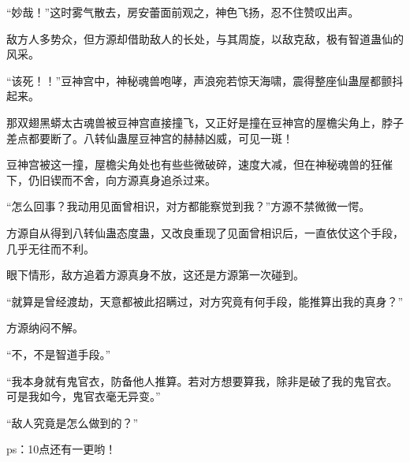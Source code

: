 \begin{this_body}
“妙哉！”这时雾气散去，房安蕾面前观之，神色飞扬，忍不住赞叹出声。

敌方人多势众，但方源却借助敌人的长处，与其周旋，以敌克敌，极有智道蛊仙的风采。

“该死！！”豆神宫中，神秘魂兽咆哮，声浪宛若惊天海啸，震得整座仙蛊屋都颤抖起来。

那双翅黑蟒太古魂兽被豆神宫直接撞飞，又正好是撞在豆神宫的屋檐尖角上，脖子差点都要断了。八转仙蛊屋豆神宫的赫赫凶威，可见一斑！

豆神宫被这一撞，屋檐尖角处也有些些微破碎，速度大减，但在神秘魂兽的狂催下，仍旧锲而不舍，向方源真身追杀过来。

“怎么回事？我动用见面曾相识，对方都能察觉到我？”方源不禁微微一愕。

方源自从得到八转仙蛊态度蛊，又改良重现了见面曾相识后，一直依仗这个手段，几乎无往而不利。

眼下情形，敌方追着方源真身不放，这还是方源第一次碰到。

“就算是曾经渡劫，天意都被此招瞒过，对方究竟有何手段，能推算出我的真身？”

方源纳闷不解。

“不，不是智道手段。”

“我本身就有鬼官衣，防备他人推算。若对方想要算我，除非是破了我的鬼官衣。可是我如今，鬼官衣毫无异变。”

“敌人究竟是怎么做到的？”

ps：10点还有一更哟！

\end{this_body}


